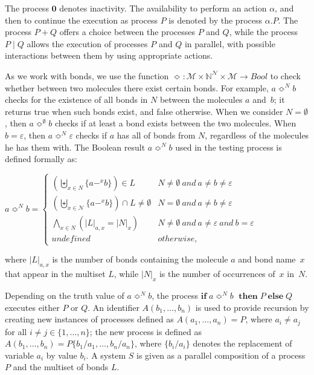 \documentclass[runningheads]{llncs}
\newcommand{\N}{\mathbb{N}}
\newcommand{\mN}{\mathcal{N}}
\begin{document}
The process $\textbf{0}$ denotes inactivity. The availability to perform an 
action $\alpha$, and then to continue the execution as process $P$ is denoted 
by the process $\alpha.P$. The process $P+Q$ offers a choice 
between the processes $P$ and $Q$, while the process $P \mid Q$ allows the 
execution of processes $P$ and $Q$ in parallel, with possible interactions 
between them by using appropriate actions.

As we work with bonds, we use the function $\Bumpeq: \mathcal{M}\times 
\N^{\mN} \times \mathcal{M} \rightarrow Bool$ to check whether between two 
molecules there exist certain bonds. For example, $a\Bumpeq^N b$ checks for the 
existence of all bonds in $N$ between the molecules $a$ and~$b$; it 
returns true when such bonds exist, and false otherwise. When we consider 
$N=\emptyset$, then $a\Bumpeq^{\emptyset}b$ checks if at least a bond 
exists between the two molecules. When $b=\varepsilon$, then $a\Bumpeq^N 
{\varepsilon}$ checks if $a$ has all of bonds from $N$, regardless of 
the molecules he has them with. The Boolean result $a \Bumpeq^N b$ used 
in the testing process is defined formally as:
\smallskip

$a \Bumpeq^N b=\begin{cases}
\displaystyle(\biguplus_{x \in N} \{a-^x b\}) \in L & N \neq \emptyset~and ~a \neq b \neq \varepsilon\\[15pt]
\displaystyle(\biguplus_{x \in \mN} \{a-^x b\}) \cap L \neq \emptyset & N = \emptyset~and ~a \neq b \neq \varepsilon\\[15pt]
\displaystyle\bigwedge_{x \in N} (|L|_{a,x}=|N|_x) & N \neq \emptyset~and ~a \neq \varepsilon ~and~b = \varepsilon\\[15pt]
undefined & otherwise,
\end{cases}$

\noindent where $|L|_{a,x}$ is the number of bonds containing the molecule 
$a$ and bond name~$x$ that appear in the multiset $L$, while $|N|_x$ is 
the number of occurrences of~$x$ in~$N$.

Depending on the truth value of $a \Bumpeq^N\!\! b $, the process 
$\textbf{if}\;a \Bumpeq^N\!\! b$ $\;\textbf{then}\;P\;\textbf{else}\;Q$ 
executes either $P$ or $Q$.  An identifier $ A(b_1,\ldots,b_n) $ is used 
to provide recursion by creating new instances of processes defined as 
$A(a_1,\ldots,a_n)=P$, where $a_i \neq a_j$ for all $i\neq j \in 
\{1,\ldots,n\}$; the new process is defined as $ A(b_1,\ldots,b_n) 
=P\{b_1/a_1,\ldots,b_n/a_n\}$, where $\{b_i/a_i\}$ denotes the replacement 
of variable $a_i$ by value $b_i$. A system $S$ is given as a parallel 
composition of a process $P$ and the multiset of bonds $L$.
\end{document}
